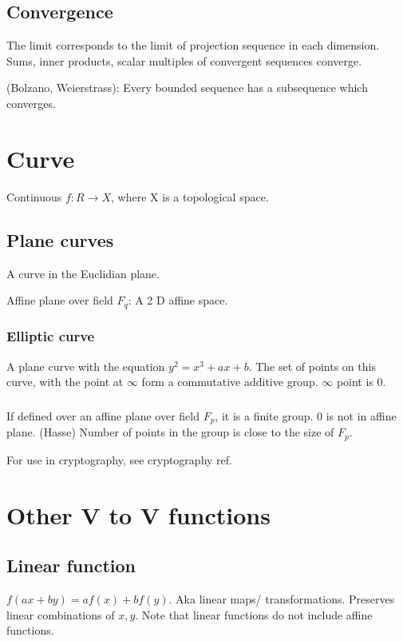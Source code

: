 \documentclass[oneside, article]{memoir}
\begin{document}
\subsection{Convergence}
The limit corresponds to the limit of projection sequence in each dimension. Sums, inner products, scalar multiples of convergent sequences converge.

(Bolzano, Weierstrass): Every bounded sequence has a subsequence which converges.

\section{Curve}
Continuous $f:R \to X$, where X is a topological space.

\subsection{Plane curves}
A curve in the Euclidian plane.

Affine plane over field $F_{q}$: A 2 D affine space.

\subsubsection{Elliptic curve}
A plane curve with the equation $y^{2} = x^{3} + ax + b$. The set of points on this curve, with the point at $\infty$ form a commutative additive group. $\infty$ point is 0.

\subsubsection{}
If defined over an affine plane over field $F_p$, it is a finite group. 0 is not in affine plane. (Hasse) Number of points in the group is close to the size of $F_p$. \why

For use in cryptography, see cryptography ref.

\section{Other V to V functions}
\subsection{Linear function}
$f(ax + by) = af(x) + bf(y)$. Aka linear maps/ transformations. Preserves linear combinations of $x, y$. Note that linear functions do not include affine functions.
\end{document}
